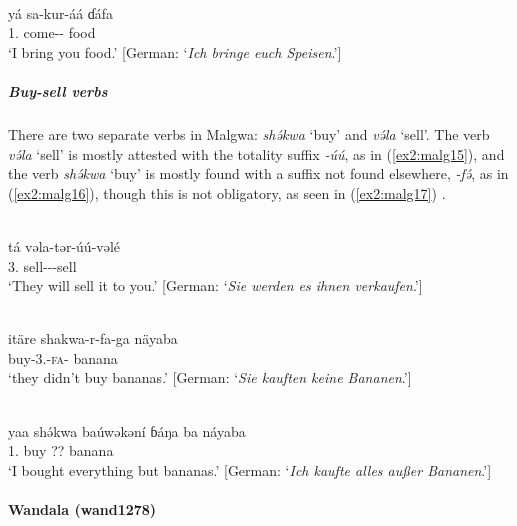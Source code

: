 \ex\label{ex2:malg14}
 \\
\gll yá sa-kur-áá ɗáfa \\ 
1. come-- food \\
\glt `I bring you food.' [German: `\textit{Ich bringe euch Speisen}.']
\z 

\subparagraph{Buy-sell verbs}

There are two separate verbs in Malgwa: \textit{shə́kwa} `buy' and \textit{və́la} `sell'. The verb  \textit{və́la} `sell' is mostly attested with the totality suffix \textit{-úú}, as in (\ref{ex2:malg15}), and the verb \textit{shə́kwa} `buy' is mostly found with a suffix not found elsewhere, \textit{-fə́}, as in (\ref{ex2:malg16}), though this is not obligatory, as seen in (\ref{ex2:malg17}) \citep[158, 160]{lohrSpracheMalgwaNara2002}. 

\ea\label{ex2:malg15}
 \\
\gll tá vəla-tər-úú-vəlé \\
3. sell---sell \\
\glt `They will sell it to you.' [German: `\textit{Sie werden es ihnen verkaufen}.']

\ex\label{ex2:malg16}
 \\
\gll itäre shakwa-r-fa-ga näyaba \\
 buy-3.-\textsc{fa}- banana  \\
\glt `they didn't buy bananas.' [German: `\textit{Sie kauften keine Bananen}.']

\ex\label{ex2:malg17}
 \\
\gll yaa shə́kwa baúwəkəní ɓáŋa ba náyaba \\
1. buy  ??  banana \\
\glt `I bought everything but bananas.' [German: `\textit{Ich kaufte alles außer Bananen}.']
\z 

\paragraph*{Wandala (wand1278)} \label{wand}

